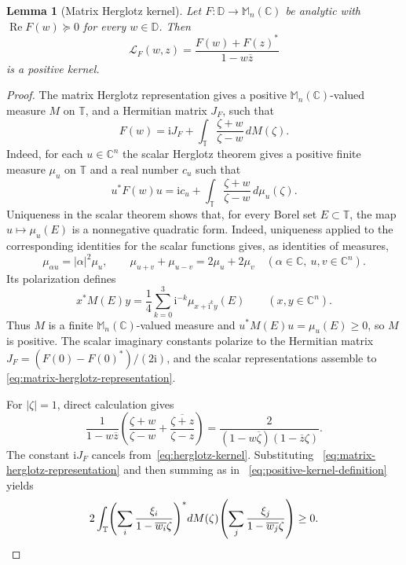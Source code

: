 \documentclass[preprints,article,submit,oneauthor]{Definitions/mdpi}
\newcounter{manuscriptresult}[section]
\theoremstyle{mdpi}
\newtheorem{lemma}[manuscriptresult]{Lemma}
\theoremstyle{definition}
\newcommand{\C}{\mathbb C}
\newcommand{\D}{\mathbb D}
\newcommand{\Torus}{\mathbb T}
\newcommand{\Mn}{\mathbb M_n(\C)}
\newcommand{\RePart}{\operatorname{Re}}
\newcommand{\iu}{\mathrm{i}}
\begin{document}
\begin{lemma}[Matrix Herglotz kernel]
\label{lem:herglotz-kernel}
Let $F\colon\D\to\Mn$ be analytic with
$\RePart F(w)\succeq0$ for every $w\in\D$.  Then
\begin{equation}
  \mathcal L_F(w,z)
  =\frac{F(w)+F(z)^*}{1-w\overline z}
  \label{eq:herglotz-kernel}
\end{equation}
is a positive kernel.
\end{lemma}

\begin{proof}
The matrix Herglotz representation gives a positive
$\Mn$-valued measure $M$ on $\Torus$, and a Hermitian matrix $J_F$, such
that
\begin{equation}
  F(w)=\iu J_F+\int_{\Torus}\frac{\zeta+w}{\zeta-w}\,dM(\zeta).
  \label{eq:matrix-herglotz-representation}
\end{equation}
Indeed, for each $u\in\C^n$ the scalar Herglotz theorem gives a positive
finite measure $\mu_u$ on $\Torus$ and a real number $c_u$ such that
\[
  u^*F(w)u=\iu c_u+
  \int_{\Torus}\frac{\zeta+w}{\zeta-w}\,d\mu_u(\zeta).
\]
Uniqueness in the scalar theorem shows that, for every Borel set
$E\subset\Torus$, the map $u\mapsto\mu_u(E)$ is a nonnegative quadratic
form.  Indeed, uniqueness applied to the corresponding identities for
the scalar functions gives, as identities of measures,
\[
  \mu_{\alpha u}=\lvert\alpha\rvert^2\mu_u,
  \qquad
  \mu_{u+v}+\mu_{u-v}=2\mu_u+2\mu_v
  \quad(\alpha\in\C,\ u,v\in\C^n).
\]
Its polarization defines
\[
  x^*M(E)y=\frac14\sum_{k=0}^3 \iu^{-k}
  \mu_{x+\iu^k y}(E)\qquad(x,y\in\C^n).
\]
Thus $M$ is a finite $\Mn$-valued measure and
$u^*M(E)u=\mu_u(E)\geq0$, so $M$ is positive.  The scalar imaginary
constants polarize to the Hermitian matrix
$J_F=(F(0)-F(0)^*)/(2\iu)$, and the scalar representations assemble to~%
\eqref{eq:matrix-herglotz-representation}.

For $\lvert\zeta\rvert=1$, direct calculation gives
\begin{equation}
  \frac{1}{1-w\overline z}\left(
   \frac{\zeta+w}{\zeta-w}
   +\overline{\frac{\zeta+z}{\zeta-z}}
  \right)
  =\frac{2}{(1-w\overline\zeta)(1-\overline z\zeta)}.
  \label{eq:scalar-herglotz-factorization}
\end{equation}
The constant $\iu J_F$ cancels from~\eqref{eq:herglotz-kernel}.  Substituting~%
\eqref{eq:matrix-herglotz-representation} and then summing as in~%
\eqref{eq:positive-kernel-definition} yields
\[
  2\int_{\Torus}
  \left(\sum_i\frac{\xi_i}{1-\overline{w_i}\zeta}\right)^*
  dM(\zeta)
  \left(\sum_j\frac{\xi_j}{1-\overline{w_j}\zeta}\right)
  \geq0.\qedhere
\]
\end{proof}
\end{document}
